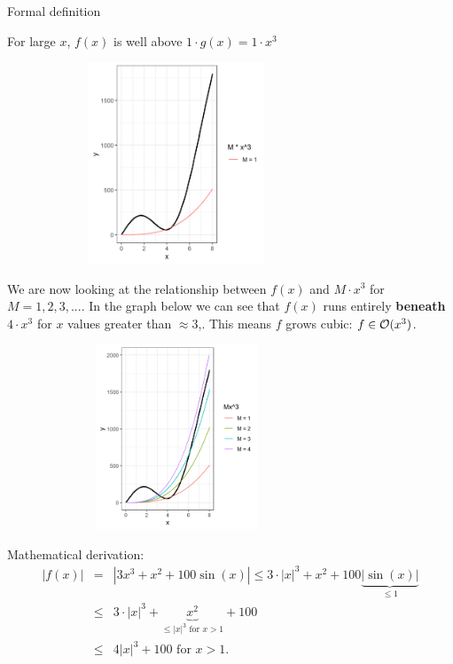 \documentclass[11pt,compress,t,notes=noshow, xcolor=table]{beamer}
\begin{document}
\begin{vbframe}{Formal definition}

For large $x$, $f(x)$ is well above $1 \cdot g(x) = 1 \cdot x^3$

\lz

\begin{center}
\begin{figure}
  \includegraphics[height = 6cm, width = 8cm]{figure_man/Example1b.png}
\end{figure}
\end{center}


\framebreak

We are now looking at the relationship between $f(x)$ and $M\cdot x^3$ for $M = 1, 2, 3, ...$. In the graph below we can see that $f(x)$ runs entirely \textbf{beneath} $4 \cdot x^3$ for $x$ values greater than $\approx 3$,. This means $f$ grows cubic: $f \in \mathcal{O}(x^3)$.


\begin{center}
\begin{figure}
  \includegraphics[height = 5.5cm, width = 8cm]{figure_man/Example1c.png}
\end{figure}
\end{center}

\framebreak

Mathematical derivation:
\begin{eqnarray*}
|f(x)| &=& | 3 x^3 + x^2 + 100 \sin(x) | \le 3 \cdot |x|^3 + x^2 + 100 \underbrace{|\sin(x)|}_{\le 1} \\ &\le& 3 \cdot |x|^3 + \underbrace{x^2}_{\le |x|^3 \text{ for } x > 1} + 100 \\ %
&\le& 4 |x|^3 + 100 \text{  for  } x > 1.
\end{eqnarray*}


\end{vbframe}
\end{document}
